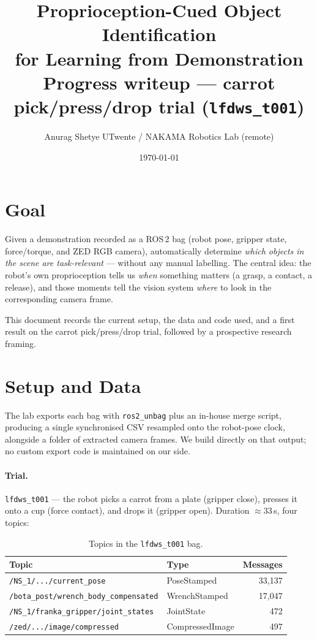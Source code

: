 \documentclass[11pt]{article}
\title{\textbf{Proprioception-Cued Object Identification\\ for Learning from Demonstration}\\[4pt]
\large Progress writeup --- carrot pick/press/drop trial (\texttt{lfdws\_t001})}
\author{Anurag Shetye \quad\textbar\quad UTwente / NAKAMA Robotics Lab (remote)}
\date{\today}
\begin{document}
\maketitle

\section{Goal}

Given a demonstration recorded as a ROS\,2 bag (robot pose, gripper state,
force/torque, and ZED RGB camera), automatically determine \emph{which objects
in the scene are task-relevant} --- without any manual labelling. The central
idea: the robot's own proprioception tells us \emph{when} something matters
(a grasp, a contact, a release), and those moments tell the vision system
\emph{where} to look in the corresponding camera frame.

This document records the current setup, the data and code used, and a first
result on the carrot pick/press/drop trial, followed by a prospective research
framing.

\section{Setup and Data}

The lab exports each bag with \texttt{ros2\_unbag} plus an in-house merge
script, producing a single synchronised CSV resampled onto the robot-pose clock,
alongside a folder of extracted camera frames. We build directly on that output;
no custom export code is maintained on our side.

\paragraph{Trial.} \texttt{lfdws\_t001} --- the robot picks a carrot from a
plate (gripper close), presses it onto a cup (force contact), and drops it
(gripper open). Duration $\approx 33$\,s, four topics:

\begin{table}[H]
\centering
\begin{tabular}{llr}
\toprule
\textbf{Topic} & \textbf{Type} & \textbf{Messages} \\
\midrule
\texttt{/NS\_1/.../current\_pose}        & PoseStamped       & 33{,}137 \\
\texttt{/bota\_post/wrench\_body\_compensated} & WrenchStamped & 17{,}047 \\
\texttt{/NS\_1/franka\_gripper/joint\_states}  & JointState    & 472 \\
\texttt{/zed/.../image/compressed}       & CompressedImage   & 497 \\
\bottomrule
\end{tabular}
\caption{Topics in the \texttt{lfdws\_t001} bag.}
\end{table}
\end{document}
